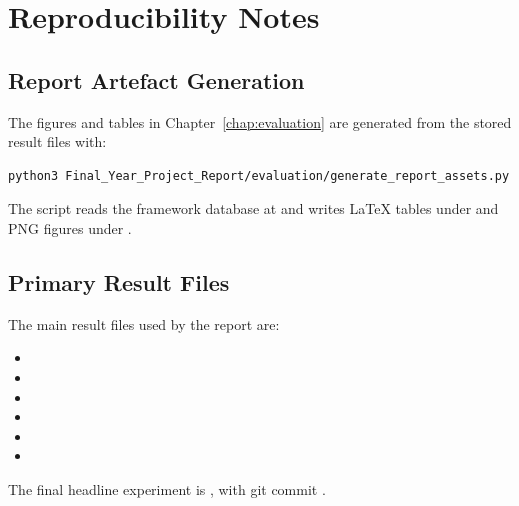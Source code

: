\appendix
\chapter{Reproducibility Notes}
\label{chap:appendix}

\section{Report Artefact Generation}

The figures and tables in Chapter~\ref{chap:evaluation} are generated from the stored result files with:
\begin{verbatim}
python3 Final_Year_Project_Report/evaluation/generate_report_assets.py
\end{verbatim}

The script reads the framework database at  and writes LaTeX tables under  and PNG figures under .

\section{Primary Result Files}

The main result files used by the report are:
\begin{itemize}
    \item {}
    \item {}
    \item {}
    \item {}
    \item {}
    \item {}
\end{itemize}

The final headline experiment is , with git commit .
